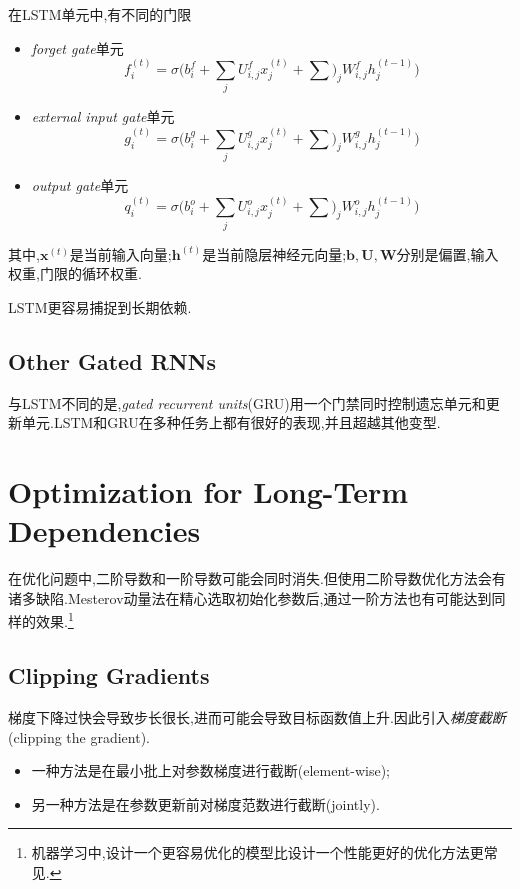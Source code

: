 在LSTM单元中,有不同的门限
\begin{itemize}
    \item \textit{forget gate}单元
    \begin{equation}
    f_i^{(t)}=\sigma\Big(b_i^f+\sum_jU_{i,j}^fx_j^{(t)}+\sum)_jW_{i,j}^fh_j^{(t-1)}\Big)
    \end{equation}
    \item \textit{external input gate}单元
    \begin{equation}
    g_i^{(t)}=\sigma\Big(b_i^g+\sum_jU_{i,j}^gx_j^{(t)}+\sum)_jW_{i,j}^gh_j^{(t-1)}\Big)
    \end{equation}
    \item \textit{output gate}单元
    \begin{equation}
    q_i^{(t)}=\sigma\Big(b_i^o+\sum_jU_{i,j}^ox_j^{(t)}+\sum)_jW_{i,j}^oh_j^{(t-1)}\Big)
    \end{equation}
\end{itemize}
其中,$\bm x^{(t)}$是当前输入向量;$\bm h^{(t)}$是当前隐层神经元向量;$\bm{b,U,W}$分别是偏置,输入权重,门限的循环权重.

LSTM更容易捕捉到长期依赖.

\subsection{Other Gated RNNs}

与LSTM不同的是,\textit{gated recurrent units}(GRU)用一个门禁同时控制遗忘单元和更新单元.LSTM和GRU在多种任务上都有很好的表现,并且超越其他变型.

\section{Optimization for Long-Term Dependencies}

在优化问题中,二阶导数和一阶导数可能会同时消失.但使用二阶导数优化方法会有诸多缺陷.Mesterov动量法在精心选取初始化参数后,通过一阶方法也有可能达到同样的效果.\footnote{机器学习中,设计一个更容易优化的模型比设计一个性能更好的优化方法更常见.}

\subsection{Clipping Gradients}

梯度下降过快会导致步长很长,进而可能会导致目标函数值上升.因此引入\textit{梯度截断}(clipping the gradient).
\begin{itemize}
    \item 一种方法是在最小批上对参数梯度进行截断(element-wise);
    \item 另一种方法是在参数更新前对梯度范数进行截断(jointly).
\end{itemize}

